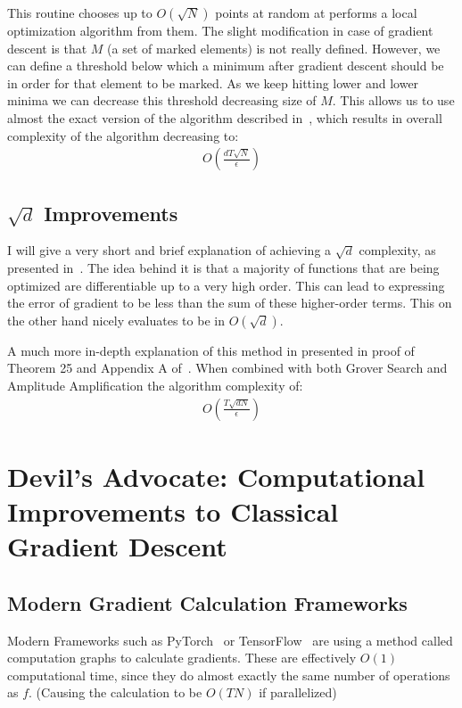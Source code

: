 \documentclass{article}
\begin{document}
This routine chooses up to $O(\sqrt{N})$ points at random at performs a local optimization algorithm from them.
The slight modification in case of gradient descent is that $M$ (a set of marked elements) is not really defined.
However, we can define a threshold below which a minimum after gradient descent should be in order for that element to be marked.
As we keep hitting lower and lower minima we can decrease this threshold decreasing size of $M$.
This allows us to use almost the exact version of the algorithm described in~\cite{lara2013new}, which results in overall complexity of
the algorithm decreasing to:
\begin{align}
    O(\frac{dT\sqrt{N}}{\epsilon})
\end{align}

\subsection[latex is a meme]{$\sqrt{d}$ Improvements}
I will give a very short and brief explanation of achieving a $\sqrt{d}$ complexity, as presented in~\cite{Gily_n_2019}.
The idea behind it is that a majority of functions that are being optimized are differentiable up to a very high order.
This can lead to expressing the error of gradient to be less than the sum of these higher-order terms.
This on the other hand nicely evaluates to be in $O(\sqrt{d})$.

A much more in-depth explanation of this method in presented in proof of Theorem 25 and Appendix A of~\cite{Gily_n_2019}.
When combined with both Grover Search and Amplitude Amplification the algorithm complexity of:
\begin{align}
    O(\frac{T\sqrt{dN}}{\epsilon})
    \label{final-complexity}
\end{align}

\section{Devil's Advocate: Computational Improvements to Classical Gradient Descent}
\label{sec:class-imp}
\subsection{Modern Gradient Calculation Frameworks}
\label{subsec:class-grad-calc-framework}
Modern Frameworks such as PyTorch~\cite{PyTorch} or TensorFlow~\cite{tensorflow2015-whitepaper} are using a method called
computation graphs to calculate gradients. These are effectively $O(1)$ computational time, since they do almost exactly
the same number of operations as $f$. (Causing the calculation to be $O(TN)$ if parallelized)
\end{document}
